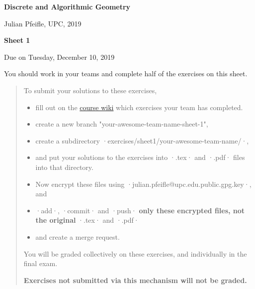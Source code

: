 \documentclass[11pt]{amsart}
\newcommand{\alert}[1]{\textbf{\color{red}#1}}
\begin{document}
\DefineShortVerb{\·}

\begin{center}
\textbf{\sffamily
   Discrete and Algorithmic Geometry }

\medskip
   Julian Pfeifle,
   UPC, 2019
\end{center}

\medskip

\begin{center}
  \textbf{\sffamily Sheet 1}

  \bigskip
Due on Tuesday, December 10, 2019
\end{center}

\bigskip

You should work in your teams and complete half of the exercises on this sheet.

\bigskip

\begin{quote}\small
  To submit your solutions to these exercises,
  \begin{itemize}[$\quad\triangleright$]
  \item fill out on the \href{https://gitlab.com/julian-upc/2019-dag-upc/wikis/completed-exercises}{course wiki} which exercises your team has completed. 
  \item create a new branch "your-awesome-team-name-sheet-1",
  \item create a subdirectory ·exercises/sheet1/your-awesome-team-name/·,
  \item and put your solutions to the exercises into ·.tex· and ·.pdf· files into that directory.
  \item Now encrypt these files using ·julian.pfeifle@upc.edu.public.gpg.key·, and
  \item ·add·, ·commit· and ·push· \alert{only these encrypted files, not the original} ·.tex· and ·.pdf·
  \item and create a merge request.
  \end{itemize}
  You will be graded collectively on these exercises, and individually in the final exam.

  \alert{Exercises not submitted via this mechanism will not be graded.}
\end{quote}
\end{document}
